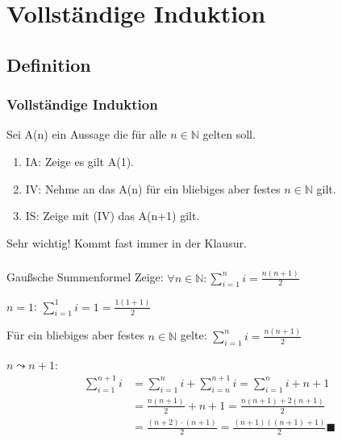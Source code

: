 \section{Vollständige Induktion}
\subsection{Definition}
\begin{frame}
  \frametitle{Vollständige Induktion}
  \begin{definition}
    Sei A(n) ein Aussage die für alle $n \in \mathbb{N}$ gelten soll.
    \begin{enumerate}
      \item IA: Zeige es gilt A(1).
      \item IV: Nehme an das A(n) für ein bliebiges aber festes $n \in \mathbb{N}$ gilt.
      \item IS: Zeige mit (IV) das A(n+1) gilt.
    \end{enumerate}
  \end{definition}
  \begin{alertblock}{Sehr wichtig!}
    Kommt fast immer in der Klausur.
  \end{alertblock}
\end{frame}
\begin{frame}[plain]
  \frametitle{}
  \begin{exampleblock}{Gaußsche Summenformel}
    Zeige: $\forall n \in \mathbb{N}: \sum \limits^{n}_{i=1} i = \frac{n(n+1)}{2}$\pause
    \begin{description}{}
      {\tiny
      \item[IA:] $n = 1$: $\sum \limits^{1}_{i=1} i = 1 = \frac{1(1+1)}{2}$
      \item[IV:] Für ein bliebiges aber festes $n \in \mathbb{N}$ gelte: $\sum \limits^{n}_{i=1} i = \frac{n(n+1)}{2}$
      \item[IS:] $n \leadsto n+1$:
        \begin{align*}
          \sum \limits^{n+1}_{i=1} i &= \sum \limits^{n}_{i=1} i + \sum \limits^{n+1}_{i=n} i
          = \sum \limits^{n}_{i=1} i + n+1\\
          &= \frac{n(n+1)}{2} + n+1 = \frac{n(n+1) + 2(n+1)}{2}\\
          &= \frac{(n+2) \cdot (n+1)}{2} = \frac{(n+1)((n+1)+1)}{2} \blacksquare
        \end{align*}
       }
    \end{description}
  \end{exampleblock}
\end{frame}

